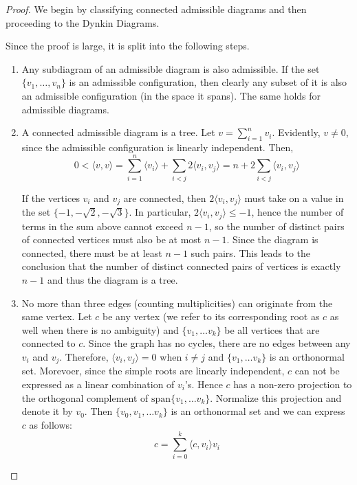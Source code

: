\begin{proof}
    We begin by classifying connected admissible diagrams and then proceeding to the Dynkin Diagrams. \newline
    
    Since the proof is large, it is split into the following steps.
    \begin{enumerate}
        \item Any subdiagram of an admissible diagram is also admissible. If the set 
        $\{v_1, \dots, v_n \}$ is an admissible configuration, then clearly any subset of it is also an admissible configuration
        (in the space it spans). The same holds for admissible diagrams.
        
        \item A connected admissible diagram is a tree. Let $v = \sum_{i=1}^{n} v_i$. Evidently, $v \not= 0$, since the admissible
        configuration is linearly independent. Then,
            \begin{equation*}
                0 < \langle v, v \rangle = \sum_{i=1}^{n} \langle v_i \rangle + \sum_{i < j} 2 \langle v_i, v_j \rangle = n + 2 \sum_{i < j} \langle v_i, v_j \rangle 
            \end{equation*}
            
        If the vertices $v_i$ and $v_j$ are connected, then $2 \langle v_i, v_j \rangle$ must take on a value in the set
        $\{-1, -\sqrt{2}, -\sqrt{3}\}$. In particular,  $2 \langle v_i, v_j \rangle \leq - 1$, hence the number of terms in the sum above
        cannot exceed $n-1$, so the number of distinct pairs of connected vertices must also be at most $n-1$. Since the diagram is connected,
        there must be at least $n-1$ such pairs. This leads to the conclusion that the number of distinct connected pairs of vertices
        is exactly $n-1$ and thus the diagram is a tree.
        
        \item No more than three edges (counting multiplicities) can originate from the same vertex.
        Let $c$ be any vertex (we refer to its corresponding root as $c$ as well when there is no ambiguity)
        and $\{v_1, \dots v_k \}$ be all vertices that are connected to $c$.
        Since the graph has no cycles, there are no edges between any $v_i$ and $v_j$.
        Therefore, $\langle v_i, v_j \rangle = 0$ when $i \not= j$ and $\{v_1, \dots v_k \}$ is an orthonormal set.
        Morevoer, since the simple roots are linearly independent, $c$ can not be expressed as a linear combination of $v_i$'s.
        Hence $c$ has a non-zero projection to the orthogonal complement of $\text{span}\{v_1, \dots v_k\}$.
        Normalize this projection and denote it by $v_0$.
        Then $\{v_0, v_1, \dots v_k \}$ is an orthonormal set and we can express $c$ as follows:
            \begin{equation*}
                c = \sum_{i=0}^k \langle c, v_i \rangle v_i
            \end{equation*}


\end{enumerate}
\end{proof}
